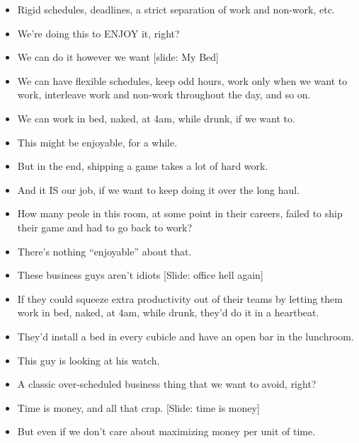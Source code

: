 \documentclass[12pt]{article}
\begin{document}
{\begin{itemize}
\item Rigid schedules, deadlines, a strict separation of work and non-work, etc.

\item We're doing this to ENJOY it, right?

\item We can do it however we want [slide:  My Bed]

\item We can have flexible schedules, keep odd hours, work only when we want to work, interleave work and non-work throughout the day, and so on.

\item We can work in bed, naked, at 4am, while drunk, if we want to.

\item This might be enjoyable, for a while.

\item But in the end, shipping a game takes a lot of hard work.

\item And it IS our job, if we want to keep doing it over the long haul.

\item How many peole in this room, at some point in their careers, failed to ship their game and had to go back to work?

\item There's nothing ``enjoyable'' about that.

\item These business guys aren't idiots [Slide: office hell again]

\item If they could squeeze extra productivity out of their teams by letting them work in bed, naked, at 4am, while drunk, they'd do it in a heartbeat.

\item They'd install a bed in every cubicle and have an open bar in the lunchroom.

\item This guy is looking at his watch.

\item A classic over-scheduled business thing that we want to avoid, right?

\item Time is money, and all that crap. [Slide: time is money]

\item But even if we don't care about maximizing money per unit of time.


\end{itemize}}
\end{document}
